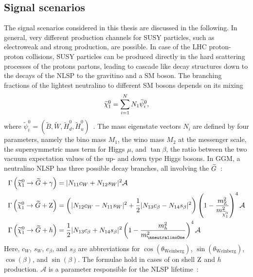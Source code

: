 \begin{enumerate}
\subsection{Signal scenarios}\label{sec:SMS}
The signal scenarios considered in this thesis are discussed in the following. In general, very different production channels for SUSY particles, such as electroweak and strong production, are possible. In case of the LHC proton-proton collisions, SUSY particles can be produced directly in the hard scattering processes of the protons partons, leading to cascade like decay structures down to the decays of the NLSP to the gravitino and a SM boson. The branching fractions of the lightest neutralino to different SM bosons depends on its mixing
\begin{equation}
 \widetilde{\chi}^{0}_{1} = \sum_{i=1}^{N} N_{1} \widetilde{\psi}_i^0,
\end{equation}
where $\widetilde{\psi}_i^0=(\widetilde{B},\widetilde{W},\widetilde{H}_d^0,\widetilde{H}_u^0)$~\cite{NLSPDecay}. The mass eigenstate vectors $N_i$ are defined by four parameters, namely the bino mass $M_1$, the wino mass $M_2$ at the messenger scale, the supersymmetric mass term for Higgs $\mu$, and $\tan{\beta}$, the ratio between the two vacuum expectation values of the up- and down type Higgs bosons. In GGM, a neutralino NLSP has three possible decay branches, all involving the $\widetilde{G}$~\cite{NLSPDecay}:
\begin{align}
 \Gamma\left(\neutralinoOne\to\gravitino+\PGg\right) & = |N_{11}c_W+N_{12}s_W|^2 \mathcal{A}                                                                                                                       \\
 \Gamma\left(\neutralinoOne\to\gravitino+\PZ\right)  & = \left(|N_{12}c_W - N_{11}s_W|^2 +\frac{1}{2}|N_{13}c_{\beta}-N_{14}s_{\beta}|^2\right)\left(1-\frac{m_{\PZ}^2}{m_{\neutralinoOne}^2}\right)^4 \mathcal{A} \\
 \Gamma\left(\neutralinoOne\to\gravitino+h\right)    & = \frac{1}{2}|N_{13}c_{\beta}+N_{14}s_{\beta}|^2\left(1-\frac{m_h^2}{m_{\nneutralinoOne}^2}\right)^4 \mathcal{A}                                            
\end{align}
Here, $c_W$, $s_W$, $c_\beta$, and $s_\beta$ are abbreviations for $\cos(\theta_{\text{Weinberg}})$, $\sin(\theta_{\text{Weinberg}})$, $\cos(\beta)$, and $\sin(\beta)$. The formulae hold in cases of on shell $\mathrm{Z}$ and $h$ production. $\mathcal{A}$ is a parameter responsible for the NLSP lifetime~\cite{NLSP1,NLSP2}:

\end{enumerate}
